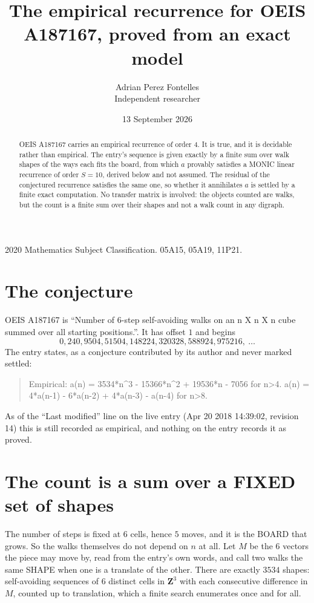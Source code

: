\documentclass[11pt,a4paper]{article}
\title{The empirical recurrence for OEIS A187167, proved from an exact model}
\author{Adrian Perez Fontelles\\ \small Independent researcher}
\date{13 September 2026}
\theoremstyle{plain}
\theoremstyle{definition}
\begin{document}
\maketitle

\begin{abstract}
OEIS A187167 carries an empirical recurrence of order $4$. It is true, and it is
decidable rather than empirical. The entry's sequence is given exactly by a finite sum over walk shapes of the ways each fits the board, from
which $a$ provably satisfies a MONIC linear recurrence of order $S=10$, derived below and not
assumed. The residual of the conjectured recurrence satisfies the same one, so whether it
annihilates $a$ is settled by a finite exact computation. No transfer matrix is involved: the objects counted are walks, but the count is a finite sum over their shapes and not a walk count in any digraph.
\end{abstract}

\noindent\small 2020 Mathematics Subject Classification. 05A15, 05A19, 11P21.\normalsize

\section{The conjecture}

OEIS A187167 is ``Number of 6-step self-avoiding walks on an n X n X n cube summed over all starting positions.''. It has offset $1$ and begins
\[
0, 240, 9504, 51504, 148224, 320328, 588924, 975216,\ \dots
\]
The entry states, as a conjecture contributed by its author and never marked settled:
\begin{quote}
Empirical: a(n) = 3534*n\^{}3 - 15366*n\^{}2 + 19536*n - 7056 for n>4. a(n) = 4*a(n-1) - 6*a(n-2) + 4*a(n-3) - a(n-4) for n>8.
\end{quote}
As of the ``Last modified'' line on the live entry (Apr 20 2018 14:39:02, revision 14)
this is still recorded as empirical, and nothing on the entry records it as proved.

\section{The count is a sum over a FIXED set of shapes}

The number of steps is fixed at $6$ cells, hence $5$ moves, and it is the BOARD
that grows. So the walks themselves do not depend on $n$ at all. Let $M$ be the $6$
vectors the piece may move by, read from the entry's own words, and call two walks the same
SHAPE when one is a translate of the other. There are exactly $3534$ shapes: self-avoiding
sequences of $6$ distinct cells in $\mathbf{Z}^{3}$ with each consecutive difference in
$M$, counted up to translation, which a finite search enumerates once and for all.
\end{document}
